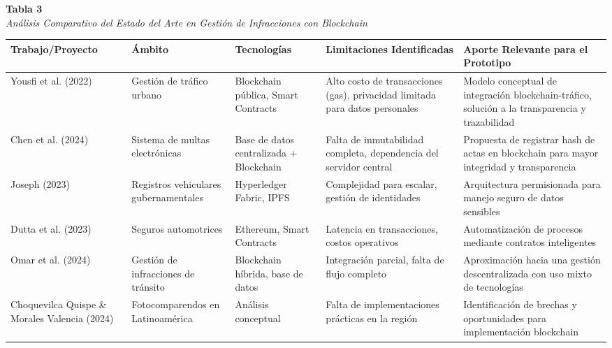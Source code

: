 \begin{table}[htbp]
    \begin{flushleft}
        \textbf{Tabla 3}\\[2em]
        \textit{Análisis Comparativo del Estado del Arte en Gestión de Infracciones con Blockchain}
    \end{flushleft}
    \vspace{1em}
    \centering
    \begin{tabular}{p{2.8cm} p{2.5cm} p{2.5cm} p{2.8cm} p{3.5cm}}
        \toprule
        \textbf{Trabajo/Proyecto} & \textbf{Ámbito} & \textbf{Tecnologías} & \textbf{Limitaciones Identificadas} & \textbf{Aporte Relevante para el Prototipo} \\
        \midrule
        Yousfi et al. (2022) & Gestión de tráfico urbano & Blockchain pública, Smart Contracts & Alto costo de transacciones (gas), privacidad limitada para datos personales & Modelo conceptual de integración blockchain-tráfico, solución a la transparencia y trazabilidad \\
        \midrule
        Chen et al. (2024) & Sistema de multas electrónicas & Base de datos centralizada + Blockchain & Falta de inmutabilidad completa, dependencia del servidor central & Propuesta de registrar hash de actas en blockchain para mayor integridad y transparencia \\
        \midrule
        Joseph (2023) & Registros vehiculares gubernamentales & Hyperledger Fabric, IPFS & Complejidad para escalar, gestión de identidades & Arquitectura permisionada para manejo seguro de datos sensibles \\
        \midrule
        Dutta et al. (2023) & Seguros automotrices & Ethereum, Smart Contracts & Latencia en transacciones, costos operativos & Automatización de procesos mediante contratos inteligentes \\
        \midrule
        Omar et al. (2024) & Gestión de infracciones de tránsito & Blockchain híbrida, base de datos & Integración parcial, falta de flujo completo & Aproximación hacia una gestión descentralizada con uso mixto de tecnologías \\
        \midrule
        Choquevilca Quispe \& Morales Valencia (2024) & Fotocomparendos en Latinoamérica & Análisis conceptual & Falta de implementaciones prácticas en la región & Identificación de brechas y oportunidades para implementación blockchain \\

\end{tabular}
\end{table}

